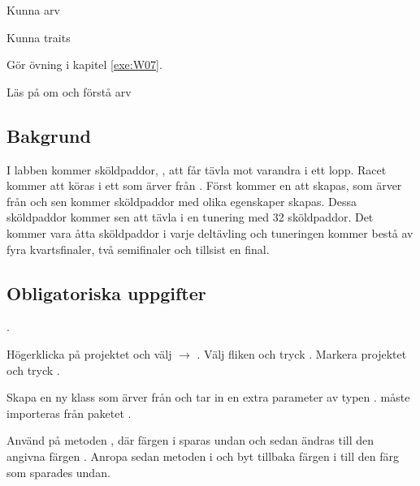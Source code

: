 

\Teamlab{\LabWeekSEVEN}

\begin{Goals}
\item Kunna arv
\item Kunna traits
\end{Goals}

\begin{Preparations}
\item Gör övning {\tt \ExeWeekSEVEN} i kapitel \ref{exe:W07}.
\item Läs på om och förstå arv

\end{Preparations}

\subsection{Bakgrund}
I labben kommer sköldpaddor, , att får tävla mot varandra i ett lopp. Racet kommer att köras i ett  som ärver från . Först kommer en  att skapas, som ärver från  och sen kommer sköldpaddor med olika egenskaper skapas. Dessa sköldpaddor kommer sen att tävla i en tunering med 32 sköldpaddor. Det kommer vara åtta sköldpaddor i varje deltävling och tuneringen kommer bestå av fyra kvartsfinaler, två semifinaler och tillsist en final.

\subsection{Obligatoriska uppgifter}

\Task {}.

\Subtask Högerklicka på projektet  och välj  $\rightarrow$ . Välj fliken  och tryck . Markera projektet  och tryck .

\Subtask Skapa en ny klass  som ärver från  och tar in en extra parameter  av typen .  måste importeras från paketet .

\Subtask Använd  på metoden , där färgen i  sparas undan och sedan ändras till den angivna färgen . Anropa sedan metoden  i  och byt tillbaka färgen i  till den färg som sparades undan.

